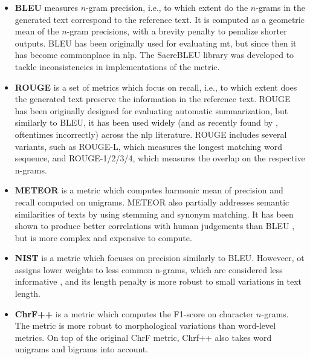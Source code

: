 \begin{itemize}
    \item \textbf{BLEU} \cite{papineni2002bleu} measures $n$-gram precision, i.e., to which extent do the $n$-grams in the generated text correspond to the reference text.  It is computed as a geometric mean of the $n$-gram precisions, with a brevity penalty to penalize shorter outputs. BLEU has been originally used for evaluating \ac{mt}, but since then it has become commonplace in \ac{nlp}. The SacreBLEU library \cite{post2018call}  was developed to tackle inconsistencies in implementations of the metric.
    \item \textbf{ROUGE} \cite{lin-2004-rouge} is a set of metrics which focus on recall, i.e., to which extent does the generated text preserve the information in the reference text. ROUGE has been originally designed for evaluating automatic summarization, but similarly to BLEU, it has been used widely (and as recently found by \citet{gruskyRogueScores2023}, oftentimes incorrectly) across the \ac{nlp} literature. ROUGE includes several variants, such as ROUGE-L, which measures the longest matching word sequence, and ROUGE-{1/2/3/4}, which measures the overlap on the respective n-grams.
    \item \textbf{METEOR} \cite{banerjee-lavie-2005-meteor} is a metric which computes harmonic mean of precision and recall computed on unigrams. METEOR also partially addresses semantic similarities of texts by using stemming and synonym matching. It has been shown to produce better correlations with human judgements than BLEU \cite{agarwal2008meteor}, but is more complex and expensive to compute.
    \item \textbf{NIST} \cite{martin2000nist} is a metric which focuses on precision similarly to BLEU. Howeveer, ot assigns lower weights to less common n-grams, which are considered less informative \cite{doddington2002automatic}, and its length penalty is more robust to small variations in text length.
    \item \textbf{ChrF++} \cite{popovic2015chrf,popovic2017chrf} is a metric which computes the F1-score on character $n$-grams. The metric is more robust to morphological variations than word-level metrics. On top of the original ChrF metric, Chrf++ also takes word unigrams and bigrams into account.
\end{itemize}
